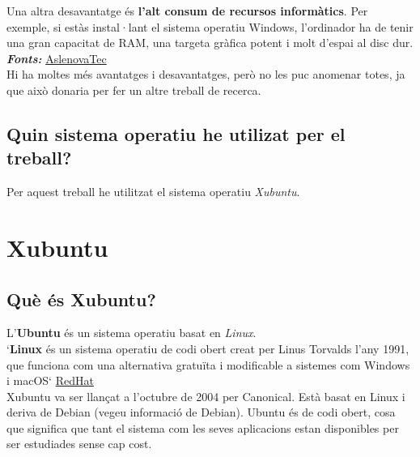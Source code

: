 Una altra desavantatge és \textbf{l’alt consum de recursos informàtics}. Per exemple, si estàs instal·lant el sistema operatiu Windows, l’ordinador ha de tenir una gran capacitat de RAM, una targeta gràfica potent i molt d’espai al disc dur.
\textit{\textbf{Fonts:}} \href{https://aslenovatec.com/reviews/ventajas-y-desventajas-del-sistema-operativo-windows/}{AslenovaTec}\\

Hi ha moltes més avantatges i desavantatges, però no les puc anomenar totes, ja que això donaria per fer un altre treball de recerca.

\subsection{Quin sistema operatiu he utilizat per el treball?}
Per aquest treball he utilitzat el sistema operatiu \textit{Xubuntu}\cite{xubuntu}.
\section{Xubuntu}
\subsection{Què és Xubuntu?}
L’\textbf{Ubuntu} és un sistema operatiu basat en \textit{Linux}.\\

`\textbf{Linux} és un sistema operatiu de codi obert creat per Linus Torvalds l’any 1991, que funciona com una alternativa gratuïta i modificable a sistemes com Windows i macOS`
\href{https://www.redhat.com/es/topics/linux}{RedHat}\\


Xubuntu va ser llançat a l’octubre de 2004 per Canonical. Està basat en Linux i deriva de Debian (vegeu informació de Debian). Ubuntu és de codi obert, cosa que significa que tant el sistema com les seves aplicacions estan disponibles per ser estudiades sense cap cost.

